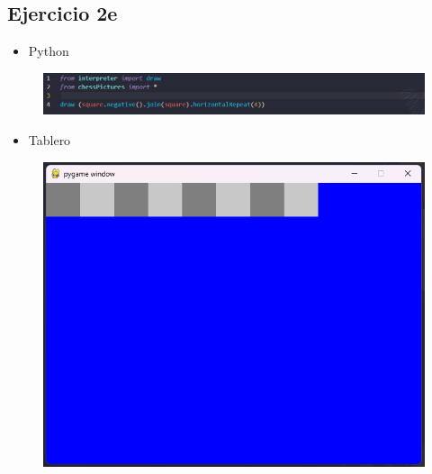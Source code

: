 \documentclass{article}
\begin{document}
	\subsection{Ejercicio 2e}
	\begin{itemize}
		\item Python
	\end{itemize}
	\begin{figure}[H]
		\centering
		\includegraphics[width=1.0\textwidth, keepaspectratio]{img/ejercicio2e}
	\end{figure}
	\begin{itemize}
		\item Tablero
	\end{itemize}
	\begin{figure}[H]
		\centering
		\includegraphics[width=1.0\textwidth, keepaspectratio]{img/ejercicio2ee}
	\end{figure}
	
\end{document}
